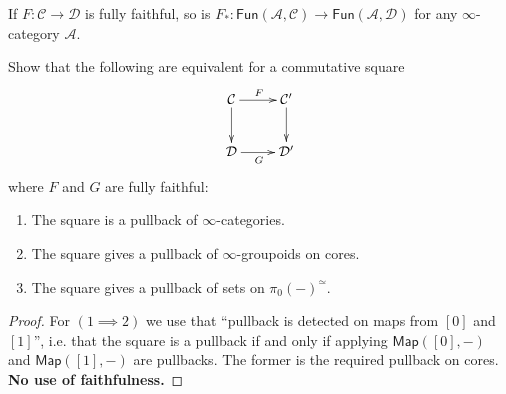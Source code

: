 \begin{lemma}
\label{lemma-fully-faithfulness-is-preserved-by-Fun(A,-)}
If $F:\mathcal{C} \to \mathcal{D}$ is fully faithful,
so is
$F_*:
\mathsf{Fun}(\mathcal{A},\mathcal{C})\to\mathsf{Fun}(\mathcal{A},\mathcal{D})$ 
for any $\infty$-category $\mathcal{A}$.
\end{lemma}

\begin{exercise}
\label{exercise-characterization-of-pullbacks-for-fully-faithful}
Show that the following are equivalent for a commutative square
$$
\xymatrix{
\mathcal{C}\ar[r]^F\ar[d]&\mathcal{C}'\ar[d]\\
\mathcal{D}\ar[r]_G&\mathcal{D}'
}
$$
where $F$ and $G$ are fully faithful:
\begin{enumerate}
\item The square is a pullback of $\infty$-categories.
\item The square gives a pullback of $\infty$-groupoids on cores.
\item The square gives a pullback of sets on $\pi_0(-)^\simeq$.
\end{enumerate} 
\end{exercise}

\begin{proof}
For $(1\implies 2)$ we use that
``pullback is detected on maps from $[0]$ and $[1]$'',
i.e. that the square is a pullback if and only if
applying $\mathsf{Map}([0],-)$ and $\mathsf{Map}([1],-)$ 
are pullbacks. The former is the required
pullback on cores. {\bf No use of faithfulness.}


\end{proof}

\label{section-}




